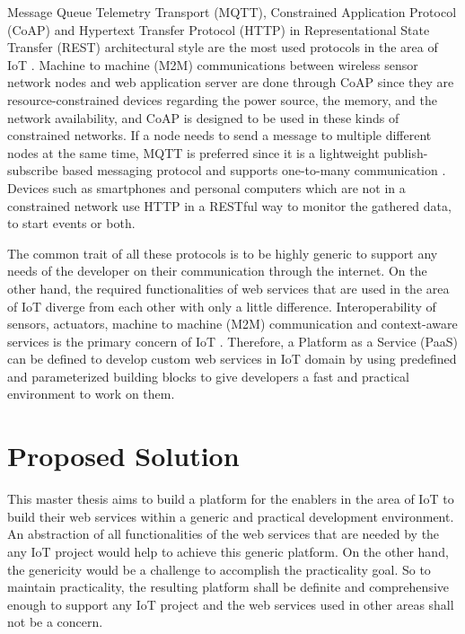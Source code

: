  Message Queue Telemetry Transport (MQTT), Constrained Application Protocol (CoAP) and Hypertext Transfer Protocol (HTTP) in Representational State Transfer (REST) architectural style are the most used protocols in the area of IoT \cite{8246418,8070130}. Machine to machine (M2M) communications between wireless sensor network nodes and web application server are done through CoAP since they are resource-constrained devices regarding the power source, the memory, and the network availability, and CoAP is designed to be used in these kinds of constrained networks. If a node needs to send a message to multiple different nodes at the same time, MQTT is preferred since it is a lightweight publish-subscribe based messaging protocol and supports one-to-many communication \cite{mqtt}. Devices such as smartphones and personal computers which are not in a constrained network use HTTP in a RESTful way to monitor the gathered data, to start events or both.

 The common trait of all these protocols is to be highly generic to support any needs of the developer on their communication through the internet. On the other hand, the required functionalities of web services that are used in the area of IoT diverge from each other with only a little difference. Interoperability of sensors, actuators, machine to machine (M2M) communication and context-aware services is the primary concern of IoT \cite{6651222}. Therefore, a Platform as a Service (PaaS) can be defined to develop custom web services in IoT domain by using predefined and parameterized building blocks to give developers a fast and practical environment to work on them.

\section{Proposed Solution}

This master thesis aims to build a platform for the enablers in the area of IoT to build their web services within a generic and practical development environment. An abstraction of all functionalities of the web services that are needed by the any IoT project would help to achieve this generic platform. On the other hand, the genericity would be a challenge to accomplish the practicality goal. So to maintain practicality, the resulting platform shall be definite and comprehensive enough to support any IoT project and the web services used in other areas shall not be a concern. 

